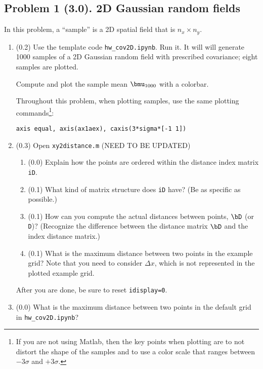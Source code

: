 \documentclass[11pt,titlepage,fleqn]{article}
\newcommand{\tfile}{{\tt hw\_cov2D.ipynb}}
\begin{document}

\pagebreak
\subsection*{Problem 1 (3.0). 2D Gaussian random fields}

In this problem, a ``sample'' is a 2D spatial field that is $n_x \times n_y$.
%
\begin{enumerate}
\item (0.2) Use the template code \tfile. Run it. It will will generate 1000 samples of a 2D Gaussian random field with prescribed covariance; eight samples are plotted.

Compute and plot the sample mean $\bmu_{1000}$ with a colorbar.

Throughout this problem, when plotting samples, use the same plotting commands\footnote{If you are not using Matlab, then the key points when plotting are to not distort the shape of the samples and to use a color scale that ranges between $-3\sigma$ and $+3\sigma$.}:

\verb+axis equal, axis(ax1aex), caxis(3*sigma*[-1 1])+

\item (0.3) Open \verb+xy2distance.m+ (NEED TO BE UPDATED)
%
\begin{enumerate}
\item (0.0) Explain how the points are ordered within the distance index matrix \verb+iD+.
\item (0.1) What kind of matrix structure does \verb+iD+ have? (Be as specific as possible.)
\item (0.1) How can you compute the actual distances between points, $\bD$ (or \verb+D+)? 
(Recognize the difference between the distance matrix $\bD$ and the index distance matrix.)
\item (0.1) What is the maximum distance between two points in the example grid?
Note that you need to consider $\Delta x$, which is not represented in the plotted example grid.
\end{enumerate}
%
After you are done, be sure to reset \verb+idisplay=0+.

\item (0.0) What is the maximum distance between two points in the default grid in \tfile?


\end{enumerate}
\end{document}
